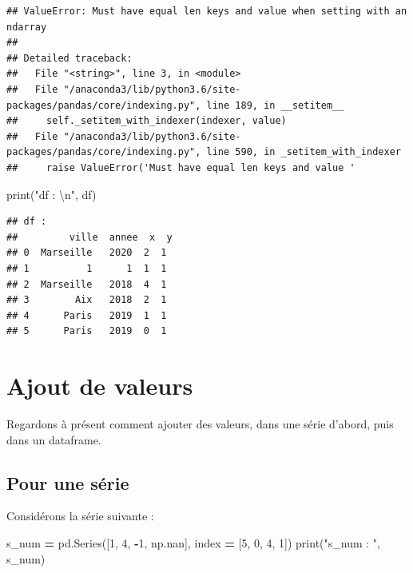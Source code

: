 \documentclass[12pt,]{book}
\newenvironment{Shaded}{\begin{snugshade}}{\end{snugshade}}
\newcommand{\DecValTok}[1]{\textcolor[rgb]{0.00,0.00,0.81}{#1}}
\newcommand{\CharTok}[1]{\textcolor[rgb]{0.31,0.60,0.02}{#1}}
\newcommand{\StringTok}[1]{\textcolor[rgb]{0.31,0.60,0.02}{#1}}
\newcommand{\OperatorTok}[1]{\textcolor[rgb]{0.81,0.36,0.00}{\textbf{#1}}}
\newcommand{\BuiltInTok}[1]{#1}
\newcommand{\NormalTok}[1]{#1}
\numberwithin{equation}{section}
\numberwithin{countremarque}{section}
\begin{document}
\begin{lstlisting}
## ValueError: Must have equal len keys and value when setting with an ndarray
## 
## Detailed traceback: 
##   File "<string>", line 3, in <module>
##   File "/anaconda3/lib/python3.6/site-packages/pandas/core/indexing.py", line 189, in __setitem__
##     self._setitem_with_indexer(indexer, value)
##   File "/anaconda3/lib/python3.6/site-packages/pandas/core/indexing.py", line 590, in _setitem_with_indexer
##     raise ValueError('Must have equal len keys and value '
\end{lstlisting}

\begin{Shaded}
\begin{Highlighting}[]
\BuiltInTok{print}\NormalTok{(}\StringTok{"df : }\CharTok{\textbackslash{}n}\StringTok{"}\NormalTok{, df)}
\end{Highlighting}
\end{Shaded}

\begin{lstlisting}
## df : 
##         ville  annee  x  y
## 0  Marseille   2020  2  1
## 1          1      1  1  1
## 2  Marseille   2018  4  1
## 3        Aix   2018  2  1
## 4      Paris   2019  1  1
## 5      Paris   2019  0  1
\end{lstlisting}

\section{Ajout de valeurs}\label{pandas-ajout-valeurs}

Regardons à présent comment ajouter des valeurs, dans une série d'abord,
puis dans un dataframe.

\subsection{Pour une série}\label{pour-une-serie-1}

Considérons la série suivante :

\begin{Shaded}
\begin{Highlighting}[]
\NormalTok{s_num }\OperatorTok{=}\NormalTok{ pd.Series([}\DecValTok{1}\NormalTok{, }\DecValTok{4}\NormalTok{, }\OperatorTok{-}\DecValTok{1}\NormalTok{, np.nan],}
\NormalTok{             index }\OperatorTok{=}\NormalTok{ [}\DecValTok{5}\NormalTok{, }\DecValTok{0}\NormalTok{, }\DecValTok{4}\NormalTok{, }\DecValTok{1}\NormalTok{])}
\BuiltInTok{print}\NormalTok{(}\StringTok{"s_num : "}\NormalTok{, s_num)}
\end{Highlighting}
\end{Shaded}
\end{document}
